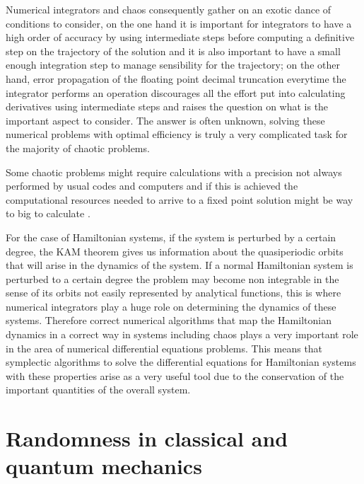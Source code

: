 Numerical integrators and chaos consequently gather on an exotic dance of conditions to consider, on the one hand it is important for integrators to have a high order of accuracy by using intermediate steps before computing a definitive step on the trajectory of the solution and it is also important to have a small enough integration step to manage sensibility for the trajectory; on the other hand, error propagation of the floating point decimal truncation everytime the integrator performs an operation discourages all the effort put into calculating derivatives using intermediate steps and raises the question on what is the important aspect to consider. The answer is often unknown, solving these numerical problems with optimal efficiency is truly a very complicated task for the majority of chaotic problems\cite{lozi2013can}.\par 

Some chaotic problems might require calculations with a precision not always performed by usual codes and computers and if this is achieved the computational resources needed to arrive to a fixed point solution might be way to big to calculate \cite{galias2016numerical}.\par 

For the case of Hamiltonian systems, if the system is perturbed by a certain degree, the KAM theorem gives us information about the quasiperiodic orbits that will arise in the dynamics of the system\cite{arnold2009proof}\cite{kolmogorov1954conservation}\cite{tabor1989chaos}. If a normal Hamiltonian system is perturbed to a certain degree the problem may become non integrable in the sense of its orbits not easily represented by analytical functions, this is where numerical integrators play a huge role on determining the dynamics of these systems. Therefore correct numerical algorithms that map the Hamiltonian dynamics in a correct way in systems including chaos plays a very important role in the area of numerical differential equations problems. This means that symplectic algorithms to solve the differential equations for Hamiltonian systems with these properties arise as a very useful tool due to the conservation of the important quantities of the overall system.



\section{Randomness in classical and quantum mechanics}

